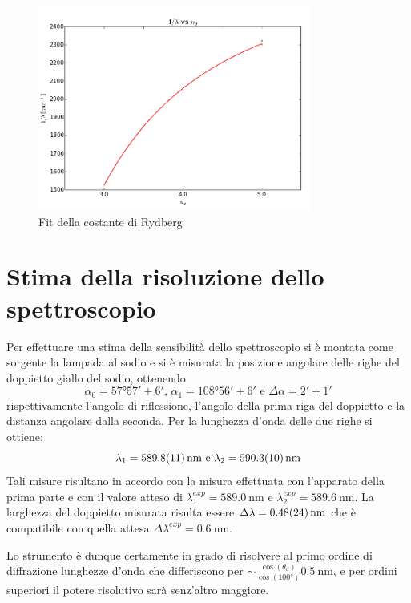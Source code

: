 	\begin{figure} [H]
		\centering
		\includegraphics[width=0.8\textwidth]{../FIgs-tabs/fit_R.png}
		\caption{Fit della costante di Rydberg}
	\end{figure}

\section{Stima della risoluzione dello spettroscopio}
	Per effettuare una stima della sensibilità dello
	spettroscopio si è montata come sorgente la 
	lampada al sodio e si è misurata la posizione angolare delle righe del doppietto giallo
	del sodio, ottenendo $$\alpha_0= \ang{57;57;} \pm 6'
	\text{, }\alpha_1=	\ang{108;56;}\pm 6' \text{ e } \Delta\alpha=2' \pm 1'$$
rispettivamente l'angolo di riflessione, l'angolo della prima riga del doppietto e la distanza angolare dalla seconda.
Per la lunghezza d'onda delle due righe si ottiene:
	$$\lambda_1= \SI{589.8 \pm 1.1}{\nano\meter}\text{ e } \lambda_2=  \SI{590.3 \pm 1.0}{\nano\meter}$$
	Tali misure risultano in accordo con 
	la misura effettuata con l'apparato della prima parte e con il valore atteso di $\lambda_1^{exp}= \SI{589.0}{\nano\meter}\text{ e } \lambda_2^{exp}=  \SI{589.6}{\nm}$.
		La larghezza del doppietto misurata risulta essere $\Delta 	\lambda=\SI{0.48 \pm 0.24}{\nano\meter}$ che è compatibile con quella attesa $\Delta 	\lambda^{exp}=\SI{0.6}{\nano\meter}$.

	Lo strumento è dunque certamente in grado di risolvere al primo ordine di diffrazione lunghezze d'onda che differiscono per $\sim \frac{    \cos (\theta_d)   }{   \cos (\ang{100})    }    \SI{0.5}{\nm} $, e per ordini superiori il potere risolutivo sarà senz'altro maggiore.